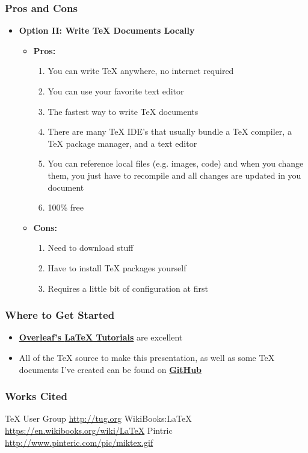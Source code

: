 \documentclass{beamer}
\begin{document}
\begin{frame}
  \frametitle{Pros and Cons}
  \begin{itemize}
    \item \textbf{Option II: Write {\TeX} Documents Locally}
      \begin{itemize}
        \item \textbf{Pros:}
          \begin{enumerate}
            \item You can write {\TeX} anywhere, no internet required
            \item You can use your favorite text editor
            \item The fastest way to write {\TeX} documents
            \item There are many {\TeX} IDE's that usually bundle a {\TeX}
              compiler, a {\TeX} package manager, and a text editor
            \item You can reference local files (e.g. images, code) and when you
              change them, you just have to recompile and all changes are
              updated in you document
            \item 100\% free
          \end{enumerate}
        \item \textbf{Cons:}
          \begin{enumerate}
            \item Need to download stuff
            \item Have to install {\TeX} packages yourself
            \item Requires a little bit of configuration at first
          \end{enumerate}
      \end{itemize}
  \end{itemize}
\end{frame}

\begin{frame}
  \frametitle{Where to Get Started}
  \begin{itemize}
    \item
      \textbf{\href{https://www.overleaf.com/learn/latex/Main_Page}{Overleaf's
          {\LaTeX} Tutorials}} are excellent
    \item All of the {\TeX} source to make this presentation, as well as some
      {\TeX} documents I've created can be found on
      \textbf{\href{https://github.com/JOHNeMac36/tex_workshop}{GitHub}}
  \end{itemize}
\end{frame}


\begin{frame}
  \frametitle{Works Cited}
  \begin{thebibliography}{9}
     {\TeX} User Group \url{http://tug.org}
     WikiBooks:{\LaTeX} \url{https://en.wikibooks.org/wiki/LaTeX}
     Pintric \url{http://www.pinteric.com/pic/miktex.gif}
  \end{thebibliography}
\end{frame}

  
\end{document}
